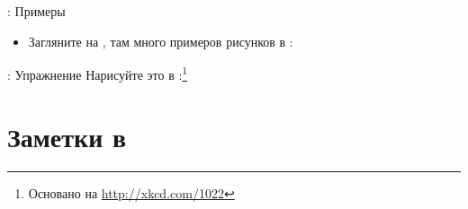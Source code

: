 \documentclass[usenames,dvipsnames]{beamer}
\begin{document}
\begin{frame}[fragile]{\insertsection: Примеры}
\begin{itemize}
\item Загляните на , там
много примеров рисунков в \tikzname{}:
\end{itemize}
\begin{figure}
\hspace*{-4mm}%
\href{http://texample.net/tikz/examples/escher-brick-penrose-triangle/}{%
\scalebox{0.33}{}}%
\hspace*{-3mm}%
\href{http://texample.net/tikz/examples/computer-science-mindmap/}{%
\scalebox{0.35}{}}%
\href{http://texample.net/tikz/examples/gajski-kuhn-y-chart/}{%
\scalebox{0.4}{}}%
\end{figure}
\end{frame}

\begin{frame}[fragile]{\insertsection: Упражнение}
Нарисуйте это в \tikzname:\footnote{Основано на \url{http://xkcd.com/1022}}
\begin{figure}

\end{figure}
\end{frame}

\section{Заметки в \protect{}}
\end{document}
